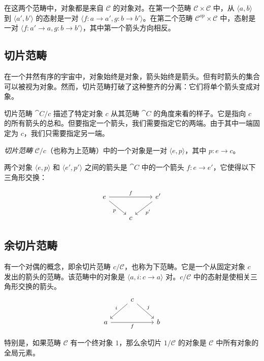 \documentclass[DaoFP]{subfiles}
\begin{document}
在这两个范畴中，对象都是来自 $\mathcal{C}$ 的对象对。在第一个范畴 $\mathcal{C} \times \mathcal{C}$ 中，从 $\langle a, b \rangle $ 到 $\langle a', b' \rangle $ 的态射是一对 $\langle f \colon a \to a', g \colon b \to b' \rangle $。在第二个范畴 $\mathcal{C}^{op} \times \mathcal{C}$ 中，态射是一对 $\langle f \colon a' \to a, g \colon b \to b' \rangle $，其中第一个箭头方向相反。

\subsection{切片范畴}

在一个井然有序的宇宙中，对象始终是对象，箭头始终是箭头。但有时箭头的集合可以被视为对象。然而，切片范畴打破了这种整齐的分离：它们将单个箭头变成对象。

切片范畴 $\cat C/c$ 描述了特定对象 $c$ 从其范畴 $\cat C$ 的角度来看的样子。它是指向 $c$ 的所有箭头的总和。但要指定一个箭头，我们需要指定它的两端。由于其中一端固定为 $c$，我们只需要指定另一端。

\emph{切片范畴} $\mathcal{C}/c$（也称为上范畴）中的一个对象是一对 $\langle e, p \rangle$，其中 $p \colon e \to c$。

两个对象 $\langle e, p \rangle$ 和 $\langle e', p' \rangle$ 之间的箭头是 $\cat C$ 中的一个箭头 $f \colon e \to e'$，它使得以下三角形交换：

\[
 \begin{tikzcd}
 e
 \arrow[rd, "p"']
 \arrow[rr, "f"]
 && e'
 \arrow[ld, "p'"]
 \\
 &c
  \end{tikzcd}
\]

\subsection{余切片范畴}

有一个对偶的概念，即余切片范畴 $c / \mathcal{C}$，也称为下范畴。它是一个从固定对象 $c$ 发出的箭头的范畴。该范畴中的对象是 $\langle a, i \colon c \to a \rangle$ 对。$c / \mathcal{C}$ 中的态射是使相关三角形交换的箭头。
\[
 \begin{tikzcd}
& c
 \arrow[rd, "j"]
 \arrow[ld, "i"']
 \\
a
\arrow[rr, "f"']
&& b
  \end{tikzcd}
\]

特别是，如果范畴 $\mathcal{C}$ 有一个终对象 $1$，那么余切片 $1 / \mathcal{C}$ 的对象是 $\mathcal{C}$ 中所有对象的全局元素。
\end{document}
